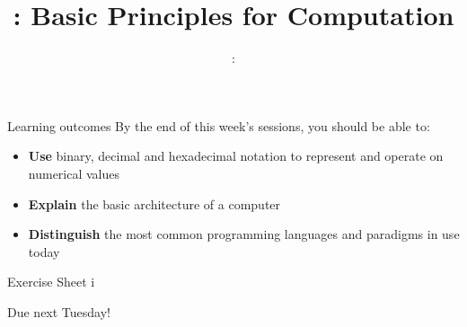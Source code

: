 \usepackage{../../beamerthemeFalmouthGamesAcademy}
\usepackage{multimedia}
\graphicspath{ {../../} }

\lstset{language=Python
}

\usepackage[normalem]{ulem}
\usepackage{wasysym}

\usepackage{pdfpages}

\usetikzlibrary{arrows,automata}




\title{\sessionnumber: Basic Principles for Computation}
\subtitle{\modulecode: \moduletitle}

\frame{\titlepage} 

\begin{frame}{Learning outcomes}
	By the end of this week's sessions, you should be able to:
	\begin{itemize}
		\item \textbf{Use} binary, decimal and hexadecimal notation to represent and operate on numerical values
		\item \textbf{Explain} the basic architecture of a computer
		\item \textbf{Distinguish} the most common programming languages and paradigms in use today
	\end{itemize}
\end{frame}





\begin{frame}{Exercise Sheet i}
    \begin{center}
        Due next Tuesday!
    \end{center}
\end{frame}

%


